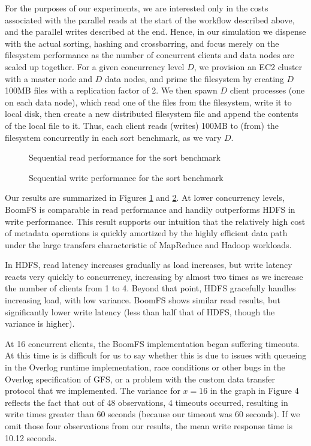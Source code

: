 \documentclass[twocolumn]{article}
\begin{document}
For the purposes of our experiments, we are interested only in the
costs associated with the parallel reads at the start of the workflow
described above, and the parallel writes described at the end.  Hence,
in our simulation we dispense with the actual sorting, hashing and
crossbarring, and focus merely on the filesystem performance as the
number of concurrent clients and data nodes are scaled up together.
For a given concurrency level $D$, we provision an EC2 cluster with a
master node and $D$ data nodes, and prime the filesystem by creating
$D$ 100MB files with a replication factor of 2.  We then spawn $D$
client processes (one on each data node), which read one of the files
from the filesystem, write it to local disk, then create a new
distributed filesystem file and append the contents of the local file
to it.  Thus, each client reads (writes) 100MB to (from) the
filesystem concurrently in each sort benchmark, as we vary $D$.

\begin{figure}
\centering
{}
\caption{Sequential read performance for the sort benchmark}
\label{fig:big-read-perf}
\end{figure}
\begin{figure}
\centering
{}
\caption{Sequential write performance for the sort benchmark}
\label{fig:big-write-perf}
\end{figure}
Our results are summarized in Figures \ref{fig:big-read-perf} and
\ref{fig:big-write-perf}.  At lower concurrency levels, BoomFS is
comparable in read performance and handily outperforms HDFS in write
performance.  This result supports our intuition that the relatively
high cost of metadata operations is quickly amortized by the highly
efficient data path under the large transfers characteristic of
MapReduce and Hadoop workloads.

In HDFS, read latency increases gradually as load increases, but write
latency reacts very quickly to concurrency, increasing by almost two
times as we increase the number of clients from 1 to 4.  Beyond that
point, HDFS gracefully handles increasing load, with low variance.
BoomFS shows similar read results, but significantly lower write
latency (less than half that of HDFS, though the variance is higher).

At 16 concurrent clients, the BoomFS implementation began suffering
timeouts.  At this time is is difficult for us to say whether this is
due to issues with queueing in the Overlog runtime implementation,
race conditions or other bugs in the Overlog specification of GFS, or
a problem with the custom data transfer protocol that we implemented.
The variance for $x=16$ in the graph in Figure 4 reflects the fact
that out of 48 observations, 4 timeouts occurred, resulting in write
times greater than 60 seconds (because our timeout was 60 seconds).
If we omit those four observations from our results, the mean write
response time is 10.12 seconds.
\end{document}
